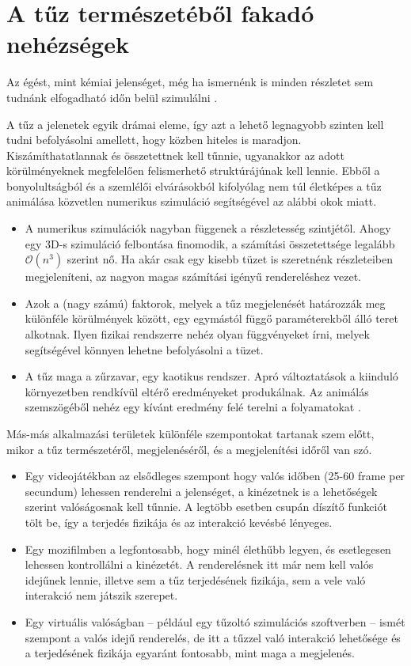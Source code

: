 \section{A tűz természetéből fakadó nehézségek}

Az égést, mint kémiai jelenséget, még ha ismernénk is minden részletet sem tudnánk elfogadható időn belül szimulálni  \cite{firestarter}.

A tűz a jelenetek egyik drámai eleme, így azt a lehető legnagyobb szinten kell tudni befolyásolni amellett, hogy közben hiteles is maradjon. Kiszámíthatatlannak és összetettnek kell tűnnie, ugyanakkor az adott körülményeknek megfelelően felismerhető struktúrájúnak kell lennie. Ebből a bonyolultságból és a szemlélői elvárásokból kifolyólag nem túl életképes a tűz animálása közvetlen numerikus szimuláció segítségével az alábbi okok miatt.
\begin{itemize}
\item
A numerikus szimulációk nagyban függenek a részletesség szintjétől. Ahogy egy 3D-s szimuláció felbontása finomodik, a számítási összetettsége legalább $\mathcal{O}(n^3)$ szerint nő. Ha akár csak egy kisebb tüzet is szeretnénk részleteiben megjeleníteni, az nagyon magas számítási igényű rendereléshez vezet.
\item
Azok a (nagy számú) faktorok, melyek a tűz megjelenését határozzák meg különféle körülmények között, egy egymástól függő paraméterekből álló teret alkotnak. Ilyen fizikai rendszerre nehéz olyan függvényeket írni, melyek segítségével könnyen lehetne befolyásolni a tüzet. 
\item
A tűz maga a zűrzavar, egy kaotikus rendszer. Apró változtatások a kiinduló környezetben rendkívül eltérő eredményeket produkálnak. Az animálás szemszögéből nehéz egy kívánt eredmény felé terelni a folyamatokat \cite{ArNiStructuralModeling}.
\end{itemize}

Más-más alkalmazási területek különféle szempontokat tartanak szem előtt, mikor a tűz természetéről, megjelenéséről, és a megjelenítési időről van szó.

\begin{itemize}
\item
Egy videojátékban az elsődleges szempont hogy valós időben (25-60 frame per secundum) lehessen renderelni a jelenséget, a kinézetnek is a lehetőségek szerint valóságosnak kell tűnnie. A legtöbb esetben csupán díszítő funkciót tölt be, így a terjedés fizikája és az interakció kevésbé lényeges.
\item
Egy mozifilmben a legfontosabb, hogy minél élethűbb legyen, és esetlegesen lehessen kontrollálni a kinézetét. A renderelésnek itt már nem kell valós idejűnek lennie, illetve sem a tűz terjedésének fizikája, sem a vele való interakció nem játszik szerepet.
\item
Egy virtuális valóságban -- például egy tűzoltó szimulációs szoftverben -- ismét szempont a valós idejű renderelés, de itt a tűzzel való interakció lehetősége és a terjedésének fizikája egyaránt fontosabb, mint maga a megjelenés.
\end{itemize}
